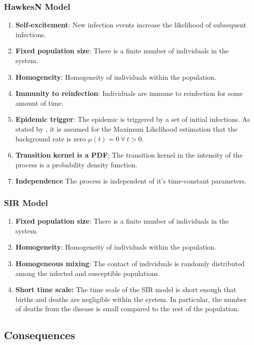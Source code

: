 \documentclass[12pt]{article}
\begin{document}
\subsubsection{HawkesN Model}
\begin{enumerate}
\item {\bf Self-excitement}: New infection events increase the likelihood of subsequent infections.
\item {\bf Fixed population size}: There is a finite number of individuals in the system.
\item {\bf Homogeneity}: Homogeneity of individuals within the population.
\item {\bf Immunity to reinfection}: Individuals are immune to reinfection for some amount of time. 
\item {\bf Epidemic trigger}: The epidemic is triggered by a set of initial infections. As stated by \cite{Rizoiu2018}, it is assumed for the Maximum Likelihood estimation that the background rate is zero $\mu(t) = 0\ \forall\ t>0$. 
\item {\bf Transition kernel is a PDF}: The transition kernel in the intensity of the process is a probability density function. 
\item {\bf Independence} The process is independent of it's time-constant parameters. 
\end{enumerate}


\subsubsection{SIR Model}
\begin{enumerate}
\item {\bf Fixed population size}: There is a finite number of individuals in the system.
\item {\bf Homogeneity}: Homogeneity of individuals within the population.
\item {\bf Homogeneous mixing}: The contact of individuals is randomly distributed among the infected and susceptible populations.  
\item {\bf Short time scale:} The time scale of the SIR model is short enough that births and deaths are negligible within the system. In particular, the number of deaths from the disease is small compared to the rest of the population. 
\end{enumerate}

\subsection{Consequences}
\end{document}
